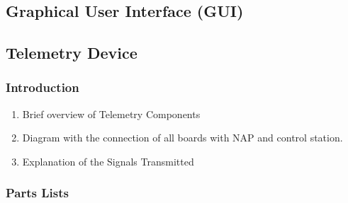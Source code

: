\subsection{Graphical User Interface (GUI)}


\subsection{Telemetry Device}

\subsubsection{Introduction}
\begin{enumerate}
    \item Brief overview of Telemetry Components
    \item Diagram with the connection of all boards with NAP and control station.
    \item Explanation of the Signals Transmitted
\end{enumerate}

\subsubsection{Parts Lists}

